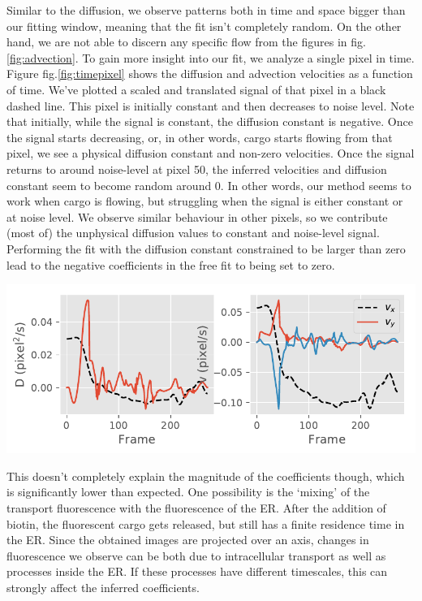 \documentclass{Dissertate}
\let\origfigure\figure
\let\endorigfigure\endfigure
\renewenvironment{figure}[1][2] {
    \expandafter\origfigure\expandafter[H]
} {
    \endorigfigure
}
\begin{document}
Similar to the diffusion, we observe patterns both in time and space
bigger than our fitting window, meaning that the fit isn't completely
random. On the other hand, we are not able to discern any specific flow
from the figures in fig.\ref{fig:advection}. To gain more insight into
our fit, we analyze a single pixel in time. Figure
fig.\ref{fig:timepixel} shows the diffusion and advection velocities as
a function of time. We've plotted a scaled and translated signal of that
pixel in a black dashed line. This pixel is initially constant and then
decreases to noise level. Note that initially, while the signal is
constant, the diffusion constant is negative. Once the signal starts
decreasing, or, in other words, cargo starts flowing from that pixel, we
see a physical diffusion constant and non-zero velocities. Once the
signal returns to around noise-level at pixel 50, the inferred
velocities and diffusion constant seem to become random around 0. In
other words, our method seems to work when cargo is flowing, but
struggling when the signal is either constant or at noise level. We
observe similar behaviour in other pixels, so we contribute (most of)
the unphysical diffusion values to constant and noise-level signal.
Performing the fit with the diffusion constant constrained to be larger
than zero lead to the negative coefficients in the free fit to being set
to zero.

\begin{figure}
\hypertarget{fig:timepixel}{%
\centering
\includegraphics{source/figures/pdf/Fit_LSgeneral_fit.pdf}
\caption{Diffusion and advection velocities of a single pixel in time.
We've plotted (scaled and translated) signal as a black dashed line to
find any correlation.}\label{fig:timepixel}
}
\end{figure}

This doesn't completely explain the magnitude of the coefficients
though, which is significantly lower than expected. One possibility is
the `mixing' of the transport fluorescence with the fluorescence of the
ER. After the addition of biotin, the fluorescent cargo gets released,
but still has a finite residence time in the ER. Since the obtained
images are projected over an axis, changes in fluorescence we observe
can be both due to intracellular transport as well as processes inside
the ER. If these processes have different timescales, this can strongly
affect the inferred coefficients.
\end{document}
